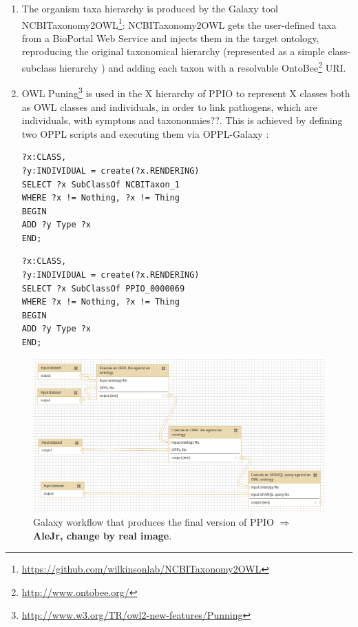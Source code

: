 \documentclass[sw]{iosart2c}
\newcommand{\myurl}[1]{\footnote{\url{#1}}}
\newcommand{\todo}[1]{\textbf{{\color{blue}$\Longrightarrow$ #1}}}
\begin{document}
\begin{enumerate}

\item The organism taxa hierarchy is produced by the Galaxy tool NCBITaxonomy2OWL\myurl{https://github.com/wilkinsonlab/NCBITaxonomy2OWL}: NCBITaxonomy2OWL gets the user-defined taxa from a BioPortal Web Service \cite{bioportal} and injects them in the target ontology, reproducing the original taxonomical hierarchy (represented as a simple class-subclass hierarchy \cite{taxa_ismb_2008}) and adding each taxon with a resolvable OntoBee\myurl{http://www.ontobee.org/} URI.

\item OWL Puning\myurl{http://www.w3.org/TR/owl2-new-features/Punning} is used in the X hierarchy of PPIO to represent X classes both as OWL classes and individuals, in order to link pathogens, which are individuals, with symptons and taxononmies??. This is achieved by defining two OPPL scripts and executing them via OPPL-Galaxy \cite{OPPL-Galaxy-JBMS}:

{\small 
\begin{verbatim}
?x:CLASS,
?y:INDIVIDUAL = create(?x.RENDERING)
SELECT ?x SubClassOf NCBITaxon_1
WHERE ?x != Nothing, ?x != Thing
BEGIN
ADD ?y Type ?x
END;
\end{verbatim}
}

{\small 
\begin{verbatim}
?x:CLASS,
?y:INDIVIDUAL = create(?x.RENDERING)
SELECT ?x SubClassOf PPIO_0000069
WHERE ?x != Nothing, ?x != Thing
BEGIN
ADD ?y Type ?x
END;
\end{verbatim}
}

\end{enumerate}

\begin{figure}
\includegraphics{galaxy-workflow}
\caption{Galaxy workflow that produces the final version of PPIO \todo{AleJr, change by real image}.}\label{fig:galaxy-workflow}
\end{figure}
\end{document}
